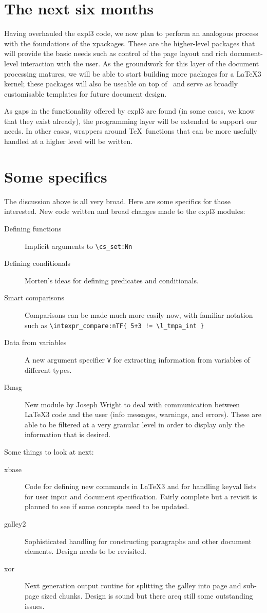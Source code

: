 \documentclass{ltnews}
\begin{document}
\section{The next six months}

Having overhauled the \textsf{expl3} code, we now plan to perform an
analogous process with the foundations of the
\textsf{xpackages}. These are the higher-level packages that will
provide the basic needs such as control of the page layout and rich
document-level interaction with the user. As the groundwork for this
layer of the document processing matures, we will be able to start
building more packages for a \LaTeX3 kernel; these packages will also
be useable on top of \LaTeXe\ and serve as broadly customisable
templates for future document design.

As gaps in the functionality offered by \textsf{expl3} are found (in
some cases, we know that they exist already), the programming layer
will be extended to support our needs. In other cases, wrappers around
\TeX\ functions that can be more usefully handled at a higher level
will be written.

\section{Some specifics}

The discussion above is all very broad. Here are some specifics for
those interested. New code written and broad changes made to the
\textsf{expl3} modules:
\begin{description}
\item [Defining functions] Implicit arguments to \verb|\cs_set:Nn|
\item [Defining conditionals] Morten's ideas for defining predicates and conditionals.
\item [Smart comparisons] Comparisons can be made much more easily
  now, with familiar notation such as 
  \verb|\intexpr_compare:nTF{ 5+3 != \l_tmpa_int }|
\item [Data from variables] A new argument specifier \texttt{V} for extracting
  information from variables of different types.
\item [l3msg] New module by Joseph Wright to deal with communication
  between \LaTeX3 code and the user (info messages, warnings, and
  errors). These are able to be filtered at a very granular level in
  order to display only the information that is desired.
\end{description}

Some things to look at next:
\begin{description}
\item [xbase] Code for defining new commands in \LaTeX3 and for
  handling keyval lists for user input and document
  specification. Fairly complete but a revisit is planned to see if
  some concepts need to be updated.
\item [galley2] Sophisticated handling for constructing paragraphs and
  other document elements. Design needs to be revisited.
\item [xor] Next generation output routine for splitting the galley into page and sub-page sized chunks. Design is sound but there areq still some outstanding issues.
\end{description}
\end{document}
